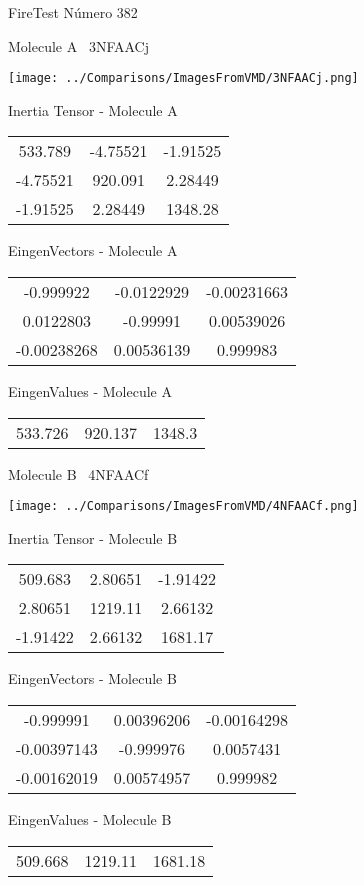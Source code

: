 \vtab[-3cm]
\begin{center}
{\large FireTest \tab Número 382}
\end{center}
\begin{multicols}{2}
\begin{center}

Molecule A \
3NFAACj

\texttt{[image: ../Comparisons/ImagesFromVMD/3NFAACj.png]}

Inertia Tensor - Molecule A \\
\begin{tabular}{|c c c|}
533.789	 & 	-4.75521	 & 	-1.91525	 \\
-4.75521	 & 	920.091	 & 	2.28449	 \\
-1.91525	 & 	2.28449	 & 	1348.28
\end{tabular}

\vtab
 EingenVectors - Molecule A     \\
\begin{tabular}{|c c c|}
-0.999922	 & 	-0.0122929	 & 	-0.00231663	 \\
0.0122803	 & 	-0.99991	 & 	0.00539026	 \\
-0.00238268	 & 	0.00536139	 & 	0.999983
\end{tabular}

\vtab
 EingenValues - Molecule A     \\
\begin{tabular}{|c c c|}
533.726	 & 	920.137	 & 	1348.3	 \\
\end{tabular}
\columnbreak

Molecule B \
4NFAACf

\texttt{[image: ../Comparisons/ImagesFromVMD/4NFAACf.png]}

Inertia Tensor - Molecule B \\
\begin{tabular}{|c c c|}
509.683	 & 	2.80651	 & 	-1.91422	 \\
2.80651	 & 	1219.11	 & 	2.66132	 \\
-1.91422	 & 	2.66132	 & 	1681.17
\end{tabular}

\vtab
 EingenVectors - Molecule B     \\
\begin{tabular}{|c c c|}
-0.999991	 & 	0.00396206	 & 	-0.00164298	 \\
-0.00397143	 & 	-0.999976	 & 	0.0057431	 \\
-0.00162019	 & 	0.00574957	 & 	0.999982
\end{tabular}

\vtab
 EingenValues - Molecule B     \\
\begin{tabular}{|c c c|}
509.668	 & 	1219.11	 & 	1681.18	 \\
\end{tabular}

\end{center}
\end{multicols}

